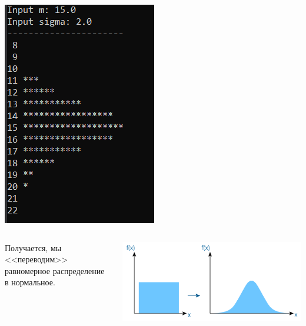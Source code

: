 \documentclass{beamer}
\begin{document}
\begin{frame}
\begin{columns}[T]
\begin{column}{0.45\textwidth}
\includegraphics[width=\textwidth]{res_norm_dist2.png}
\end{column}
\end{columns}
\end{frame}


\begin{frame}
\Large
\begin{columns}[T]
\begin{column}{0.5\textwidth}
Получается, мы <<переводим>> равномерное распределение в нормальное.
\end{column}
\begin{column}{0.6\textwidth}
\includegraphics[width=\textwidth]{31764eb4365ae9ea42cbdd270b6e6513.png}
\end{column}
\end{columns}
\end{frame}
\end{document}
